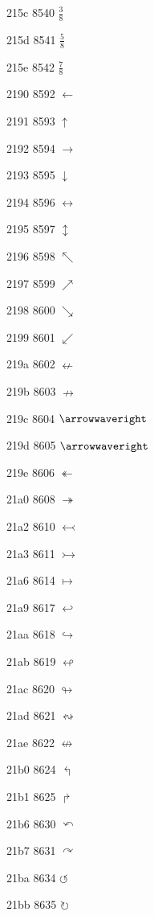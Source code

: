 \documentclass[11pt]{article}
\begin{document}
215c 8540 \ensuremath{\frac{3}{8}}

215d 8541 \ensuremath{\frac{5}{8}}

215e 8542 \ensuremath{\frac{7}{8}}

2190 8592 \ensuremath{\leftarrow}

2191 8593 \ensuremath{\uparrow}

2192 8594 \ensuremath{\rightarrow}

2193 8595 \ensuremath{\downarrow}

2194 8596 \ensuremath{\leftrightarrow}

2195 8597 \ensuremath{\updownarrow}

2196 8598 \ensuremath{\nwarrow}

2197 8599 \ensuremath{\nearrow}

2198 8600 \ensuremath{\searrow}

2199 8601 \ensuremath{\swarrow}

219a 8602 \ensuremath{\nleftarrow}

219b 8603 \ensuremath{\nrightarrow}

219c 8604 \ensuremath{\arrowwaveright}

219d 8605 \ensuremath{\arrowwaveright}

219e 8606 \ensuremath{\twoheadleftarrow}

21a0 8608 \ensuremath{\twoheadrightarrow}

21a2 8610 \ensuremath{\leftarrowtail}

21a3 8611 \ensuremath{\rightarrowtail}

21a6 8614 \ensuremath{\mapsto}

21a9 8617 \ensuremath{\hookleftarrow}

21aa 8618 \ensuremath{\hookrightarrow}

21ab 8619 \ensuremath{\looparrowleft}

21ac 8620 \ensuremath{\looparrowright}

21ad 8621 \ensuremath{\leftrightsquigarrow}

21ae 8622 \ensuremath{\nleftrightarrow}

21b0 8624 \ensuremath{\Lsh}

21b1 8625 \ensuremath{\Rsh}

21b6 8630 \ensuremath{\curvearrowleft}

21b7 8631 \ensuremath{\curvearrowright}

21ba 8634 \ensuremath{\circlearrowleft}

21bb 8635 \ensuremath{\circlearrowright}
\end{document}
